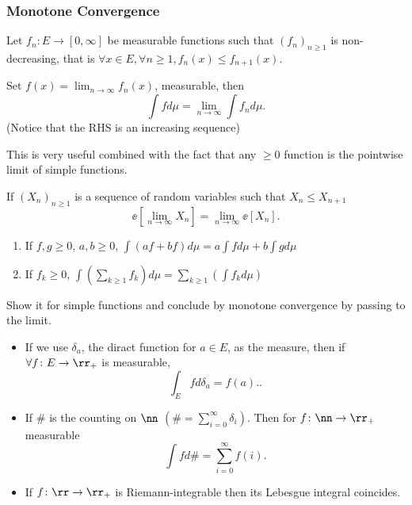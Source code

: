 \documentclass[../main.tex]{subfiles}
\begin{document}
\subsubsection{Monotone Convergence}
\begin{theorem}
  Let $f_n \colon E \to [0, \infty]$ be measurable functions such that
  $(f_n)_{n \geq 1}$ is non-decreasing, that is $\forall x \in E,
  \forall n \geq 1, f_n(x) \leq f_{n+1}(x)$.

  \vspace{0.2em}
  \noindent
  Set $f(x) = \lim_{n \to \infty} f_n(x)$, measurable, then
  \[
  \int f d\mu = \lim_{n \to \infty} \int f_n d\mu
  .\] 
  (Notice that the RHS is an increasing sequence)
\end{theorem}  

This is very useful combined with the fact that any $\geq 0$ function
is the pointwise limit of simple functions.

\begin{theorem}
  If $(X_n)_{n \geq 1}$ is a sequence of random variables such that
  $X_n \leq X_{n + 1}$ 
  \[
    \ee [\lim_{n \to \infty} X_n] = \lim_{n \to \infty} \ee[X_n]
  .\] 
\end{theorem}

\begin{corollary}
    \hfill

    \begin{enumerate}
      \item If $f, g \geq 0$, $a, b \geq 0$, $\int (af + bf)d\mu  =
        a\int f d\mu + b \int g d\mu$
      \item If $f_k \geq 0$, $\int(\sum_{k \geq 1} f_k) d\mu = \sum_{k
        \geq 1} (\int f_k d\mu) $
    \end{enumerate}
\end{corollary}
\begin{sketch}
    Show it for simple functions and conclude by monotone convergence
    by passing to the limit.
\end{sketch}

\begin{example}
    \hfill

    \begin{itemize}
      \item If we use $\delta_a$, the diract function for $a \in E$, as the measure,
        then if $\forall f \colon E \to \rr_+$ is measurable, 
        \[
          \int_E f d\delta_a = f(a).
        .\] 
    \item If $\#$ is the counting on $\nn$ $(\# = \sum_{i = 0}^\infty
      \delta_i)$. Then for $f \colon \nn \to \rr_+$ measurable
        \[
          \int f d\# = \sum_{i = 0}^\infty f(i)
        .\] 
    \item If $f \colon \rr \to \rr_+$ is Riemann-integrable then its
      Lebesgue integral coincides.
    \end{itemize}
\end{example}
\end{document}

